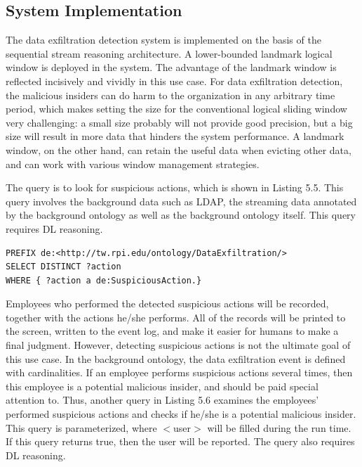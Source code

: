 \subsection{System Implementation}
The data exfiltration detection system is implemented on the basis of the sequential stream reasoning architecture. 
A lower-bounded landmark logical window is deployed in the system. 
The advantage of the landmark window is reflected incisively and vividly in this use case. 
For data exfiltration detection, the malicious insiders can do harm to the organization in any arbitrary time period, which makes setting the size for the conventional logical sliding window very challenging: a small size probably will not provide good precision, but a big size will result in more data that hinders the system performance. 
A landmark window, on the other hand, can retain the useful data when evicting other data, and can work with various window management strategies. 

The query is to look for suspicious actions, which is shown in Listing 5.5. 
This query involves the background data such as LDAP, the streaming data annotated by the background ontology as well as the background ontology itself.
This query requires DL reasoning. 

\begin{lstlisting}[language=SPARQL,caption={Suspicious Action Query},basicstyle=\small, frame=single]
PREFIX de:<http://tw.rpi.edu/ontology/DataExfiltration/>
SELECT DISTINCT ?action 
WHERE { ?action a de:SuspiciousAction.}
\end{lstlisting}

Employees who performed the detected suspicious actions will be recorded, together with the actions he/she performs. 
All of the records will be printed to the screen, written to the event log, and make it easier for humans to make a final judgment. 
However, detecting suspicious actions is not the ultimate goal of this use case.
In the background ontology, the data exfiltration event is defined with cardinalities.
If an employee performs suspicious actions several times, then this employee is a potential malicious insider, and should be paid special attention to. 
Thus, another query in Listing 5.6 examines the employees' performed suspicious actions and checks if he/she is a potential malicious insider. 
This query is parameterized, where $<$user$>$ will be filled during the run time. 
If this query returns true, then the user will be reported. 
The query also requires DL reasoning. 

